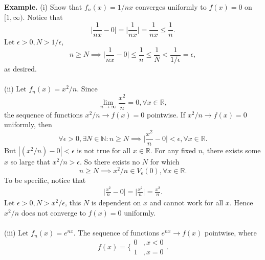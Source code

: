 \documentclass{article}
\begin{document}
           \textbf{Example.} (i) Show that $f_n(x) = 1/nx$ converges uniformly to $f(x) = 0$ on $[1,\infty)$. Notice that 
           \begin{equation*}
               \bigg|\frac{1}{nx} - 0\bigg| = \bigg|\frac{1}{nx}\bigg|
               = \frac{1}{nx}
               \leq \frac{1}{n}.
           \end{equation*}
           Let $\epsilon > 0, N > 1/\epsilon$, 
           \begin{equation*}
               n \geq N \implies \bigg|\frac{1}{nx} - 0\bigg| \leq \frac{1}{n} \leq \frac{1}{N} < \frac{1}{1/\epsilon} = \epsilon,
           \end{equation*}
           as desired.
           \\ \\
           (ii) Let $f_n(x)=x^2/n$. Since
           \begin{equation*}
               \lim_{n \to \infty} \frac{x^2}{n} = 0, \forall x \in \mathbb{R},
           \end{equation*}
           the sequence of functions $x^2/n \to f(x)=0$ pointwise. If $x^2/n \to f(x)=0$ uniformly, then
           \begin{equation*}
               \forall \epsilon > 0, \exists N \in \mathbb{N}: n \geq N \implies  \bigg|\frac{x^2}{n} - 0\bigg| < \epsilon, \forall x \in \mathbb{R}.
           \end{equation*}
           But $|(x^2/n)-0|<\epsilon$ is not true for all $x \in \mathbb{R}$. For any fixed $n$, there exists some $x$ so large that $x^2/n > \epsilon$. So there exists no $N$ for which 
           \begin{equation*}
               n \geq N \implies x^2/n \in V_\epsilon(0), \forall x \in \mathbb{R}.
           \end{equation*}
           To be specific, notice that
           \begin{align*}
               \bigg|\frac{x^2}{n}-0\bigg| = \bigg|\frac{x^2}{n}\bigg| = \frac{x^2}{n}.
           \end{align*}
           Let $\epsilon >0, N > x^2/\epsilon$, this $N$ is dependent on $x$ and cannot work for all $x$. Hence $x^2/n$ does not converge to $f(x)=0$ uniformly.
           \\ \\
           (iii) Let $f_n(x) = e^{nx}$. The sequence of functions $e^{nx} \to f(x)$ pointwise, where
           \begin{equation*}
               f(x) = \bigg\{ \begin{matrix} 0 & ,x<0 \\ 1 & ,x =0\end{matrix}.
           \end{equation*}
\end{document}
